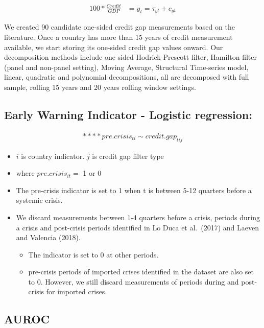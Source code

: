 \documentclass[
  12pt,
]{article}
\providecommand{\tightlist}{%
  \setlength{\itemsep}{0pt}\setlength{\parskip}{0pt}}
\begin{document}
\begin{align}
    100*\frac{Credit}{GDP} &= y_t = \tau_{yt} + c_{yt}
\end{align}

We created 90 candidate one-sided credit gap measurements based on the literature. Once a country has more than 15 years of credit measurement available, we start storing its one-sided credit gap values onward. Our decomposition methods include one sided Hodrick-Prescott filter, Hamilton filter (panel and non-panel setting), Moving Average, Structural Time-series model, linear, quadratic and polynomial decompositions, all are decomposed with full sample, rolling 15 years and 20 years rolling window settings.

\hypertarget{early-warning-indicator---logistic-regression}{%
\subsection{Early Warning Indicator - Logistic regression:}\label{early-warning-indicator---logistic-regression}}

\begin{align}****
  pre.crisis_{ti} \sim credit.gap_{tij}
\end{align}

\begin{itemize}
\item
  \(i\) is country indicator. \(j\) is credit gap filter type
\item
  where \(pre.crisis_{it}=\) 1 or 0
\item
  The pre-crisis indicator is set to 1 when t is between 5-12 quarters before a systemic crisis.
\item
  We discard measurements between 1-4 quarters before a crisis, periods during a crisis and post-crisis periods identified in Lo Duca et al.~(2017) and Laeven and Valencia (2018).

  \begin{itemize}
  \tightlist
  \item
    The indicator is set to 0 at other periods.
  \item
    pre-crisis periods of imported crises identified in the dataset are also set to 0. However, we still discard measurements of periods during and post-crisis for imported crises.
  \end{itemize}
\end{itemize}

\hypertarget{auroc}{%
\subsection{AUROC}\label{auroc}}
\end{document}
